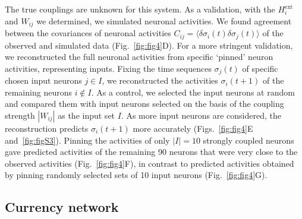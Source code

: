 \documentclass[prx,twocolumn,twoside,showpacs,superscriptaddress]{revtex4-1}
\begin{document}
The true couplings are unknown for this system. As a  validation, with the $H_{i}^{{\textrm{ext}}}$ and $W_{ij}$ we determined, we simulated neuronal activities. %
We found agreement between the covariances of neuronal activities $C_{ij}= \langle \delta \sigma_i(t) \delta \sigma_j(t) \rangle$ 
of the observed and simulated data (Fig.~\ref{fig:fig4}D).
For a more stringent validation, we reconstructed the full neuronal activities from specific `pinned' neuron activities, representing inputs.
Fixing the time sequences $\sigma_j(t)$ of specific chosen input neurons $j \in I$, we reconstructed the activities $\sigma_i(t+1)$ of the remaining neurons $i \not\in I$. %
As a control, we selected the input neurons at random and compared them with input neurons selected on the basis of the coupling strength $|W_{ij}|$ as the input set $I.$
As more input neurons are considered, the reconstruction predicts $\sigma_i(t+1)$ more accurately (Figs.~\ref{fig:fig4}E and~\ref{fig:figS3}). %
 Pinning the activities of only $|I|=10$ strongly coupled neurons gave predicted activities of the remaining 90 neurons that were very close to the observed activities (Fig.~\ref{fig:fig4}F), in contrast to predicted activities obtained by pinning randomly selected sets of 10 input neurons (Fig.~\ref{fig:fig4}G).

\subsection{Currency network}
\end{document}
